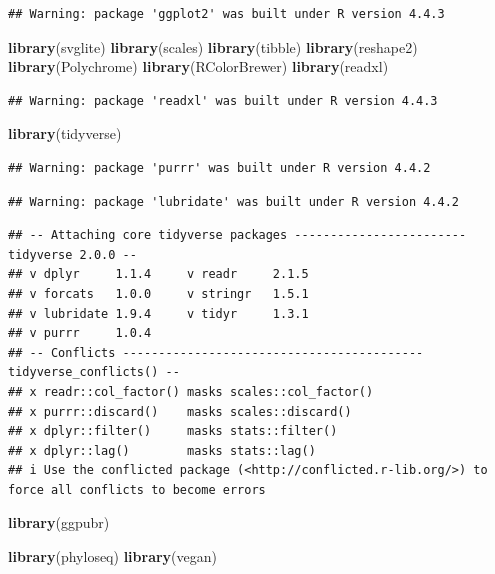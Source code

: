 \documentclass[
]{article}
\newenvironment{Shaded}{\begin{snugshade}}{\end{snugshade}}
\newcommand{\FunctionTok}[1]{\textcolor[rgb]{0.13,0.29,0.53}{\textbf{#1}}}
\newcommand{\NormalTok}[1]{#1}
\begin{document}
\begin{verbatim}
## Warning: package 'ggplot2' was built under R version 4.4.3
\end{verbatim}

\begin{Shaded}
\begin{Highlighting}[]
\FunctionTok{library}\NormalTok{(svglite)}
\FunctionTok{library}\NormalTok{(scales)}
\FunctionTok{library}\NormalTok{(tibble)}
\FunctionTok{library}\NormalTok{(reshape2)}
\FunctionTok{library}\NormalTok{(Polychrome)}
\FunctionTok{library}\NormalTok{(RColorBrewer)}
\FunctionTok{library}\NormalTok{(readxl)}
\end{Highlighting}
\end{Shaded}

\begin{verbatim}
## Warning: package 'readxl' was built under R version 4.4.3
\end{verbatim}

\begin{Shaded}
\begin{Highlighting}[]
\FunctionTok{library}\NormalTok{(tidyverse)}
\end{Highlighting}
\end{Shaded}

\begin{verbatim}
## Warning: package 'purrr' was built under R version 4.4.2
\end{verbatim}

\begin{verbatim}
## Warning: package 'lubridate' was built under R version 4.4.2
\end{verbatim}

\begin{verbatim}
## -- Attaching core tidyverse packages ------------------------ tidyverse 2.0.0 --
## v dplyr     1.1.4     v readr     2.1.5
## v forcats   1.0.0     v stringr   1.5.1
## v lubridate 1.9.4     v tidyr     1.3.1
## v purrr     1.0.4     
## -- Conflicts ------------------------------------------ tidyverse_conflicts() --
## x readr::col_factor() masks scales::col_factor()
## x purrr::discard()    masks scales::discard()
## x dplyr::filter()     masks stats::filter()
## x dplyr::lag()        masks stats::lag()
## i Use the conflicted package (<http://conflicted.r-lib.org/>) to force all conflicts to become errors
\end{verbatim}

\begin{Shaded}
\begin{Highlighting}[]
\FunctionTok{library}\NormalTok{(ggpubr)}

\FunctionTok{library}\NormalTok{(phyloseq)}
\FunctionTok{library}\NormalTok{(vegan)}
\end{Highlighting}
\end{Shaded}
\end{document}
